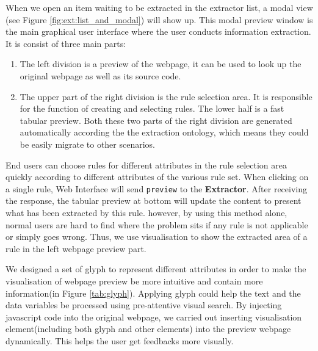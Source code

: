 When we open an item waiting to be extracted in the extractor list, a modal view (see Figure \ref{fig:ext:list_and_modal}) will show up. This modal preview window is the main graphical user interface where the user conducts information extraction. It is consist of three main parts:
\begin{enumerate}
  \item The left division is a preview of the webpage, it can be used to look up the original webpage as well as its source code. 
  \item The upper part of the right division is the rule selection area. It is responsible for the function of creating and selecting rules. The lower half is a fast tabular preview. Both these two parts of the right division are generated automatically according the the extraction ontology, which means they could be easily migrate to other scenarios.
\end{enumerate}

End users can choose rules for different attributes in the rule selection area quickly according to different attributes of the various rule set. When clicking on a single rule, Web Interface will send \texttt{preview} to the \textbf{Extractor}. After receiving the response, the tabular preview at bottom will update the content to present what has been extracted by this rule. however, by using this method alone, normal users are hard to find where the problem sits if any rule is not applicable or simply goes wrong. Thus, we use visualisation to show the extracted area of a rule in the left webpage preview part.

We designed a set of glyph to represent different attributes in order to make the visualisation of webpage preview be more intuitive and contain more information(in Figure \ref{tab:glyph}). Applying glyph could help the text and the data variables be processed using pre-attentive visual search\cite{tory2004human}. By injecting javascript code into the original webpage, we carried out inserting visualisation element(including both glyph and other elements) into the preview webpage dynamically. This helps the user get feedbacks more visually.

